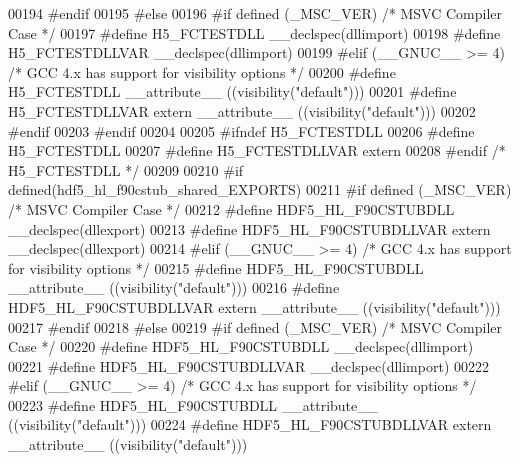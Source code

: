 \begin{DoxyCode}
00194 \textcolor{preprocessor}{  #endif}
00195 \textcolor{preprocessor}{#else}
00196 \textcolor{preprocessor}{  #if defined (\_MSC\_VER)  }\textcolor{comment}{/* MSVC Compiler Case */}\textcolor{preprocessor}{}
00197 \textcolor{preprocessor}{    #define H5\_FCTESTDLL \_\_declspec(dllimport)}
00198 \textcolor{preprocessor}{    #define H5\_FCTESTDLLVAR \_\_declspec(dllimport)}
00199 \textcolor{preprocessor}{  #elif (\_\_GNUC\_\_ >= 4)  }\textcolor{comment}{/* GCC 4.x has support for visibility options */}\textcolor{preprocessor}{}
00200 \textcolor{preprocessor}{    #define H5\_FCTESTDLL \_\_attribute\_\_ ((visibility("default")))}
00201 \textcolor{preprocessor}{    #define H5\_FCTESTDLLVAR extern \_\_attribute\_\_ ((visibility("default")))}
00202 \textcolor{preprocessor}{  #endif}
00203 \textcolor{preprocessor}{#endif}
00204 
00205 \textcolor{preprocessor}{#ifndef H5\_FCTESTDLL}
00206 \textcolor{preprocessor}{  #define H5\_FCTESTDLL}
00207 \textcolor{preprocessor}{  #define H5\_FCTESTDLLVAR extern}
00208 \textcolor{preprocessor}{#endif }\textcolor{comment}{/* H5\_FCTESTDLL */}\textcolor{preprocessor}{}
00209 
00210 \textcolor{preprocessor}{#if defined(hdf5\_hl\_f90cstub\_shared\_EXPORTS)}
00211 \textcolor{preprocessor}{  #if defined (\_MSC\_VER)  }\textcolor{comment}{/* MSVC Compiler Case */}\textcolor{preprocessor}{}
00212 \textcolor{preprocessor}{    #define HDF5\_HL\_F90CSTUBDLL \_\_declspec(dllexport)}
00213 \textcolor{preprocessor}{    #define HDF5\_HL\_F90CSTUBDLLVAR extern \_\_declspec(dllexport)}
00214 \textcolor{preprocessor}{  #elif (\_\_GNUC\_\_ >= 4)  }\textcolor{comment}{/* GCC 4.x has support for visibility options */}\textcolor{preprocessor}{}
00215 \textcolor{preprocessor}{    #define HDF5\_HL\_F90CSTUBDLL \_\_attribute\_\_ ((visibility("default")))}
00216 \textcolor{preprocessor}{    #define HDF5\_HL\_F90CSTUBDLLVAR extern \_\_attribute\_\_ ((visibility("default")))}
00217 \textcolor{preprocessor}{  #endif}
00218 \textcolor{preprocessor}{#else}
00219 \textcolor{preprocessor}{  #if defined (\_MSC\_VER)  }\textcolor{comment}{/* MSVC Compiler Case */}\textcolor{preprocessor}{}
00220 \textcolor{preprocessor}{    #define HDF5\_HL\_F90CSTUBDLL \_\_declspec(dllimport)}
00221 \textcolor{preprocessor}{    #define HDF5\_HL\_F90CSTUBDLLVAR \_\_declspec(dllimport)}
00222 \textcolor{preprocessor}{  #elif (\_\_GNUC\_\_ >= 4)  }\textcolor{comment}{/* GCC 4.x has support for visibility options */}\textcolor{preprocessor}{}
00223 \textcolor{preprocessor}{    #define HDF5\_HL\_F90CSTUBDLL \_\_attribute\_\_ ((visibility("default")))}
00224 \textcolor{preprocessor}{    #define HDF5\_HL\_F90CSTUBDLLVAR extern \_\_attribute\_\_ ((visibility("default")))}

\end{DoxyCode}

